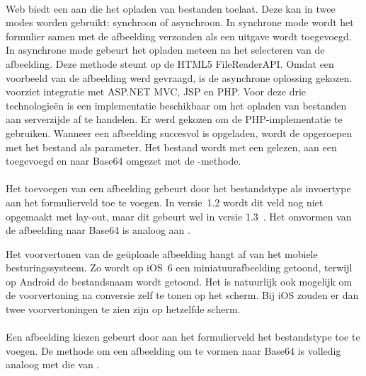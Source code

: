 \paragraph{\kendo}
\kendo{} Web biedt een  aan die het opladen van bestanden toelaat.
Deze  kan in twee modes worden gebruikt: synchroon of asynchroon.
In synchrone mode wordt het formulier samen met de afbeelding verzonden als een uitgave wordt toegevoegd.
In asynchrone mode gebeurt het opladen meteen na het selecteren van de afbeelding.
Deze methode steunt op de HTML5 FileReaderAPI.
Omdat een voorbeeld van de afbeelding werd gevraagd, is de asynchrone oplossing gekozen.	
\kendo{} voorziet integratie met ASP.NET MVC,  JSP en PHP.
Voor deze drie technologieën is een implementatie beschikbaar om het opladen van bestanden aan serverzijde af te handelen.
Er werd gekozen om de PHP-implementatie te gebruiken.
Wanneer een afbeelding succesvol is opgeladen, wordt de  opgeroepen met het bestand als parameter.
Het bestand wordt met een  gelezen,  aan een  toegevoegd en naar Base64 omgezet met de -methode.

\paragraph{\jqm}
Het toevoegen van een afbeelding gebeurt door het bestandstype als invoertype aan het formulierveld toe te voegen. 
In versie~1.2 wordt dit veld nog niet opgemaakt met lay-out, maar dit gebeurt wel in versie 1.3~\cite{JQuery2013d}. 
Het omvormen van de afbeelding naar Base64 is analoog aan \kendo{}.

Het voorvertonen van de geüploade afbeelding hangt af van het mobiele besturingssysteem.
Zo wordt op iOS~6 een miniatuurafbeelding getoond, terwijl op Android de bestandsnaam wordt getoond.
Het is natuurlijk ook mogelijk om de voorvertoning na conversie zelf te tonen op het scherm.
Bij iOS zouden er dan twee voorvertoningen te zien zijn op hetzelfde scherm.

\paragraph{\lungo}
Een afbeelding kiezen gebeurt door aan het formulierveld het bestandstype toe te voegen.
De methode om een afbeelding om te vormen naar Base64 is volledig analoog met die van \kendo{}.

